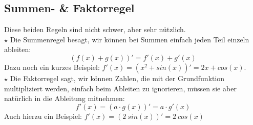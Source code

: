 \subsection{Summen- \& Faktorregel}
	Diese beiden Regeln sind nicht schwer, aber sehr nützlich.\\

	\(\star\) Die Summenregel besagt, wir können bei Summen einfach jeden Teil
	einzeln ableiten:
	\[(f(x)+g(x))'=f'(x)+g'(x)\]
	Dazu noch ein kurzes Beispiel: \(f'(x)=(x^2+sin(x))'=2x+cos(x)\).\\

	\(\star\) Die Faktorregel sagt, wir können Zahlen, die mit der Grundfunktion
	multipliziert werden, einfach beim Ableiten zu ignorieren, müssen sie aber
	natürlich in die Ableitung mitnehmen:
	\[f'(x)=(a\cdot g(x))'=a\cdot g'(x)\]
	Auch hierzu ein Beispiel: \(f'(x)=(2\ sin(x))'=2\ cos(x)\)
